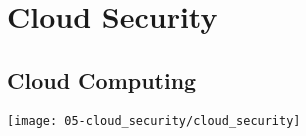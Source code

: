 

\section{Cloud Security}

\subsection{Cloud Computing}
\begin{center}
    \texttt{[image: 05-cloud\_security/cloud\_security]}
    \vspace{-8pt}
\end{center}

